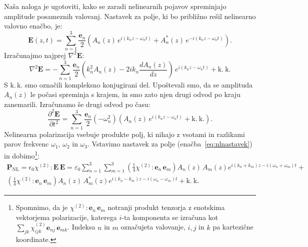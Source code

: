 Naša naloga
je ugotoviti, kako se zaradi nelinearnih pojavov spreminjajo amplitude posameznih valovanj.
Nastavek za polje, ki bo približno rešil nelinearno valovno enačbo, je:
\begin{equation}
\mathbf{E}(z,t) = \sum_{n=1}^3 \frac{\mathbf{e}_{n}}{2}\left(A_{n}(z)\, 
e^{i(k_{n}z-\omega_{n}t)}+A_{n}^{*}(z)\, e^{-i(k_{n}z-\omega_{n}t)}\right)\!\!.
\label{eq:nlnastavek}
\end{equation}
Izračunajmo najprej $\nabla^{2}\mathbf{E}$:
\begin{equation}
\nabla^{2}\mathbf{E}=-\sum_{n=1}^3 \frac{\mathbf{e}_{n}}{2}\left(k_{n}^{2}A_{n}(z)-2ik_{n}
\frac{dA_{n}(z)}{dz}\right)\, e^{i(k_{n}z-\omega_{n}t)}+\mathrm{k.~k.}
\label{8.5}
\end{equation}
S k.\,k. smo označili kompleksno konjugirani del. Upoštevali smo,
da se amplituda $A_{n}(z)$ le počasi spreminja s krajem, in smo zato njen
drugi odvod po kraju zanemarili.
Izračunamo še drugi odvod po času:
\begin{equation}
\frac{\partial^2\mathbf{E}}{\partial t^2}=\sum_{n=1}^3 \frac{\mathbf{e}_{n}}{2}
\left(-\omega_n^2\right) \left(A_{n}(z)\, e^{i(k_{n}z-\omega_{n}t)}+\mathrm{k.~k.}\right)\!\!.
\label{8.5a}
\end{equation}
Nelinearna polarizacija vsebuje produkte polj, ki nihajo z
vsotami in razlikami parov frekvenc $\omega_{1}$, $\omega_{2}$ in
$\omega_{3}$.
Vstavimo nastavek za polje (enačba~\ref{eq:nlnastavek}) 
in dobimo\footnote{Spomnimo, da je $\chi^{(2)}:\mathbf{e}_{n}\,\mathbf{e}_{m}$ 
notranji produkt tenzorja z enotskima vektorjema polarizacije, 
katerega $i$-ta komponenta se izračuna kot $\sum_{jk}\chi^{(2)}_{ijk}\mathbf{e}_{nj}\,\mathbf{e}_{mk}$.
Indeksa $n$ in $m$ označujeta valovanje, $i, j$ in $k$ pa kartezične koordinate.}:
\begin{equation}
\begin{split}
\mathbf{P}_{\mathrm{NL}}= \epsilon_{0}\chi^{(2)}:\mathbf{E}\, \mathbf{E} =
\varepsilon_0 \sum_{n=1}^3 \sum_{m=1}^3 
 \left( \frac{1}{4} \chi^{(2)}:\mathbf{e}_{n}\,\mathbf{e}_{m}\right) 
 A_{n}(z)\,A_{m}(z) e^{i(k_{n}+k_{m})z-i(\omega_{n}+\omega_{m})t}+  \\
\left( \frac{1}{4} \chi^{(2)}:\mathbf{e}_{n}\,\mathbf{e}_{m}\right)
A_{n}(z)\,A_{m}^*(z) e^{i(k_{n}-k_{m})z-i(\omega_{n}-\omega_{m})t}+ \mathrm{k.~k.}
\label{8.5b}
\end{split}
\end{equation}

